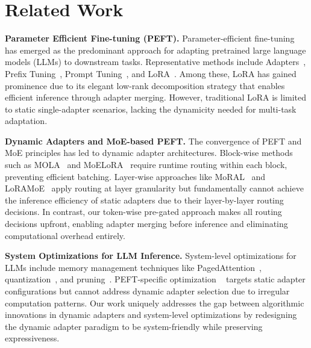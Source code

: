 \section{Related Work}
\noindent\textbf{Parameter Efficient Fine-tuning (PEFT).}
Parameter-efficient fine-tuning has emerged as the predominant approach for adapting pretrained large language models (LLMs) to downstream tasks. Representative methods include Adapters~\cite{houlsby2019parameter}, Prefix Tuning~\cite{Li2021PrefixTuningOC}, Prompt Tuning~\cite{Lester2021ThePO}, and LoRA~\cite{Hu2021LoRALA}. Among these, LoRA has gained prominence due to its elegant low-rank decomposition strategy that enables efficient inference through adapter merging. However, traditional LoRA is limited to static single-adapter scenarios, lacking the dynamicity needed for multi-task adaptation.

\noindent\textbf{Dynamic Adapters and MoE-based PEFT.}
The convergence of PEFT and MoE principles has led to dynamic adapter architectures. Block-wise methods such as MOLA~\cite{gao2024higher} and MoELoRA~\cite{luo2024moelora} require runtime routing within each block, preventing efficient batching. Layer-wise approaches like MoRAL~\cite{yang2024moral} and LoRAMoE~\cite{dou2024loramoe} apply routing at layer granularity but fundamentally cannot achieve the inference efficiency of static adapters due to their layer-by-layer routing decisions. In contrast, our token-wise pre-gated approach makes all routing decisions upfront, enabling adapter merging before inference and eliminating computational overhead entirely.

\noindent\textbf{System Optimizations for LLM Inference.}
System-level optimizations for LLMs include memory management techniques like PagedAttention~\cite{kwon2023efficient}, quantization~\cite{Frantar2022GPTQAP}, and pruning~\cite{Frantar2023SparseGPTML}. PEFT-specific optimization ~\cite{Ye2023ASPENHL} targets static adapter configurations but cannot address dynamic adapter selection due to irregular computation patterns. Our work uniquely addresses the gap between algorithmic innovations in dynamic adapters and system-level optimizations by redesigning the dynamic adapter paradigm to be system-friendly while preserving expressiveness.

